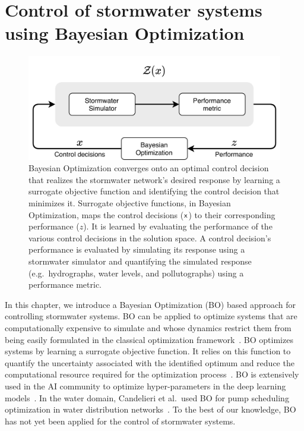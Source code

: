 \section{Control of stormwater systems using Bayesian Optimization}\label{sec:bae}
\begin{figure}
	\centering
	\includegraphics[width=0.90\linewidth]{gfx/Chapter-4/bae-opt.png}
	\caption{Bayesian Optimization converges onto an optimal control decision that realizes the stormwater network's desired response by learning a surrogate objective function and identifying the control decision that minimizes it. Surrogate objective functions, in Bayesian Optimization, maps the control decisions (${\mathsf{x}}$) to their corresponding performance ($z$). It is learned by evaluating the performance of the various control decisions in the solution space. A control decision's performance is evaluated by simulating its response using a stormwater simulator and quantifying the simulated response (e.g.\ hydrographs, water levels, and pollutographs) using a performance metric.}\label{fig:bae}
\end{figure}

In this chapter, we introduce a Bayesian Optimization (BO) based approach for controlling stormwater systems.
BO can be applied to optimize systems that are computationally expensive to simulate and whose dynamics restrict them from being easily formulated in the classical optimization framework~\cite{frazier2018tutorial}.
BO optimizes systems by learning a surrogate objective function.
It relies on this function to quantify the uncertainty associated with the identified optimum and reduce the computational resource required for the optimization process~\cite{frazier2018tutorial}. 
BO is extensively used in the AI community to optimize hyper-parameters in the deep learning models~\cite{chen_huang_2018, brochu2010tutorial, frazier2018tutorial}.
In the water domain, Candelieri et al.\ used BO for pump scheduling optimization in water distribution networks~\cite{Candelieri_Perego_Archetti_2018}.
To the best of our knowledge, BO has not yet been applied for the control of stormwater systems.

